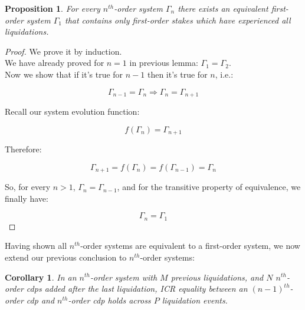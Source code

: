 \documentclass[reqno]{article}
\newtheorem{corollary}{Corollary}[theorem]
\newtheorem{proposition}[theorem]{Proposition}
\begin{document}
\begin{proposition} \label{result:6}
  For every $n^{th}$-order system $\Gamma_n$ there exists an equivalent first-order system $\Gamma_1$ that contains only first-order stakes which have experienced all liquidations.
\end{proposition}

\begin{proof}
  We prove it by induction.\\
  We have already proved for $n=1$ in previous lemma: $\Gamma_1=\Gamma_2$.\\
  Now we show that if it’s true for $n-1$ then it’s true for $n$, i.e.:

\begin{equation}
    \Gamma_{n-1} = \Gamma_n \Rightarrow \Gamma_n = \Gamma_{n+1}
\end{equation}

Recall our system evolution function: 

\begin{equation} 
    f(\Gamma_n)=\Gamma_{n+1}
\end{equation}

Therefore:

\begin{equation} 
    \Gamma_{n+1} = f(\Gamma_n) = f(\Gamma_{n-1}) = \Gamma_n
\end{equation}

\bigskip
So, for every $n > 1$, $\Gamma_n = \Gamma_{n-1}$, and for the transitive property of equivalence, we finally have:

\begin{equation}
    \Gamma_n=\Gamma_1
\end{equation}
\end{proof}

\bigskip
Having shown all $n^{th}$-order systems are equivalent to a first-order system, we now extend our previous conclusion to $n^{th}$-order systems:

\begin{corollary} \label{result:7}
  In an $n^{th}$-order system with $M$ previous liquidations, and $N$ $n^{th}$-order cdps added after the last liquidation, ICR equality between an $(n-1)^{th}$-order cdp and $n^{th}$-order cdp holds across $P$ liquidation events.
\end{corollary}
\end{document}

